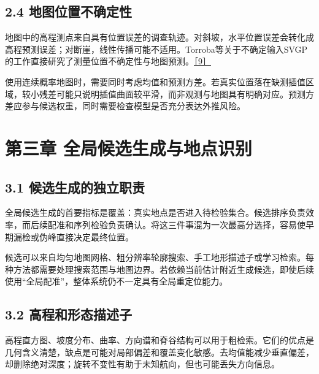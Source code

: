 \hypertarget{ux5730ux56feux4f4dux7f6eux4e0dux786eux5b9aux6027}{%
\subsection{2.4 地图位置不确定性}\label{ux5730ux56feux4f4dux7f6eux4e0dux786eux5b9aux6027}}

地图中的高程测点来自具有位置误差的调查轨迹。对斜坡，水平位置误差会转化成高程预测误差；对断崖，线性传播可能不适用。Torroba等关于不确定输入SVGP的工作直接研究了测量位置不确定性与地图预测。\href{https://arxiv.org/abs/2203.10893}{［9］}

使用连续概率地图时，需要同时考虑均值和预测方差。若真实位置落在缺测插值区域，较小残差可能只说明插值曲面较平滑，而非观测与地图具有明确对应。预测方差应参与候选权重，同时需要检查模型是否充分表达外推风险。

\hypertarget{ux7b2cux4e09ux7ae0-ux5168ux5c40ux5019ux9009ux751fux6210ux4e0eux5730ux70b9ux8bc6ux522b}{%
\section{第三章 全局候选生成与地点识别}\label{ux7b2cux4e09ux7ae0-ux5168ux5c40ux5019ux9009ux751fux6210ux4e0eux5730ux70b9ux8bc6ux522b}}

\hypertarget{ux5019ux9009ux751fux6210ux7684ux72ecux7acbux804cux8d23}{%
\subsection{3.1 候选生成的独立职责}\label{ux5019ux9009ux751fux6210ux7684ux72ecux7acbux804cux8d23}}

全局候选生成的首要指标是覆盖：真实地点是否进入待检验集合。候选排序负责效率，而后续配准和序列检验负责确认。将这三件事混为一次最高分选择，容易使早期漏检或伪峰直接决定最终位置。

候选可以来自均匀地图网格、粗分辨率轮廓搜索、手工地形描述子或学习检索。每种方法都需要处理搜索范围与地图边界。若依赖当前估计附近生成候选，即使后续使用``全局配准''，整体系统仍不一定具有全局重定位能力。

\hypertarget{ux9ad8ux7a0bux548cux5f62ux6001ux63cfux8ff0ux5b50}{%
\subsection{3.2 高程和形态描述子}\label{ux9ad8ux7a0bux548cux5f62ux6001ux63cfux8ff0ux5b50}}

高程直方图、坡度分布、曲率、方向谱和脊谷结构可以用于粗检索。它们的优点是几何含义清楚，缺点是可能对局部偏差和覆盖变化敏感。去均值能减少垂直偏差，却删除绝对深度；旋转不变性有助于未知航向，但也可能丢失方向信息。

